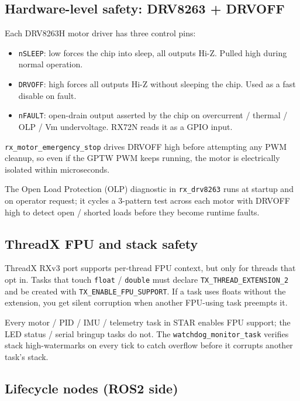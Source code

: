 \subsection{Hardware-level safety: DRV8263 + DRVOFF}

Each DRV8263H motor driver has three control pins:

\begin{itemize}
  \item \texttt{nSLEEP}: low forces the chip into sleep, all outputs
        Hi-Z. Pulled high during normal operation.
  \item \texttt{DRVOFF}: high forces all outputs Hi-Z without
        sleeping the chip. Used as a fast disable on fault.
  \item \texttt{nFAULT}: open-drain output asserted by the chip on
        overcurrent / thermal / OLP / Vm undervoltage. RX72N reads it
        as a GPIO input.
\end{itemize}

\texttt{rx\_motor\_emergency\_stop} drives DRVOFF high before
attempting any PWM cleanup, so even if the GPTW PWM keeps running,
the motor is electrically isolated within microseconds.

The Open Load Protection (OLP) diagnostic in \texttt{rx\_drv8263}
runs at startup and on operator request; it cycles a 3-pattern test
across each motor with DRVOFF high to detect open / shorted loads
before they become runtime faults.

\subsection{ThreadX FPU and stack safety}

ThreadX RXv3 port supports per-thread FPU context, but only for
threads that opt in. Tasks that touch \texttt{float} / \texttt{double}
must declare \texttt{TX\_THREAD\_EXTENSION\_2} and be created with
\texttt{TX\_ENABLE\_FPU\_SUPPORT}. If a task uses floats without the
extension, you get silent corruption when another FPU-using task
preempts it.

Every motor / PID / IMU / telemetry task in STAR enables FPU
support; the LED status / serial bringup tasks do not. The
\texttt{watchdog\_monitor\_task} verifies stack high-watermarks on
every tick to catch overflow before it corrupts another task's stack.

\subsection{Lifecycle nodes (ROS2 side)}

